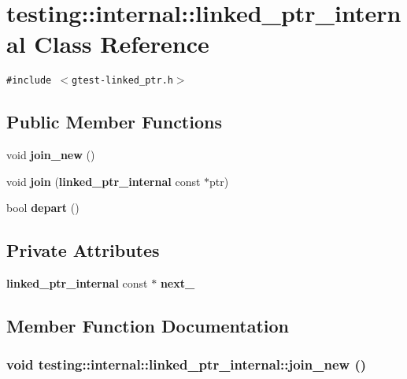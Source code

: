 \section{testing::internal::linked\_\-ptr\_\-internal Class Reference}
\label{classtesting_1_1internal_1_1linked__ptr__internal}
{\tt \#include $<$gtest-linked\_\-ptr.h$>$}

\subsection*{Public Member Functions}
\begin{CompactItemize}
\item 
void {\bf join\_\-new} ()
\item 
void {\bf join} ({\bf linked\_\-ptr\_\-internal} const $\ast$ptr)
\item 
bool {\bf depart} ()
\end{CompactItemize}
\subsection*{Private Attributes}
\begin{CompactItemize}
\item 
{\bf linked\_\-ptr\_\-internal} const $\ast$ {\bf next\_\-}
\end{CompactItemize}


\subsection{Member Function Documentation}
\subsubsection{\setlength{\rightskip}{0pt plus 5cm}void testing::internal::linked\_\-ptr\_\-internal::join\_\-new ()\hspace{0.3cm}{\tt  [inline]}}\label{classtesting_1_1internal_1_1linked__ptr__internal_c6568ecdc7613bebe9e649ed9162f36d}


